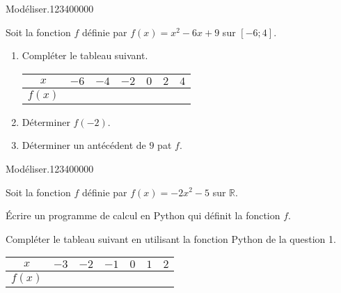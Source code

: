 \begin{pageAD}  %
\restoregeometry %

\begin{ExoCad}{Modéliser.}{1234}{0}{0}{0}{0}{0}

Soit la fonction $f$ définie par $f(x)=x^2-6x+9$ sur $[-6;4]$.  

\begin{enumerate}
\item Compléter le tableau suivant.

\begin{tabular}{|c|c|c|c|c|c|c|}
\hline 
$x$ & $-6$ &  $-4$ &  $-2$ &  $0$ &  $2$ &  $4$ \\ 
\hline 
$f(x)$ &   &   &   &  &  &   \\ 
\hline 
\end{tabular} 
\item Déterminer $f(-2)$.

\item Déterminer un antécédent de $9$ pat $f$.

\end{enumerate}


\end{ExoCad}




\begin{ExoCad}{Modéliser.}{1234}{0}{0}{0}{0}{0}

Soit la fonction $f$ définie par $f(x)=-2x^2-5$ sur $\mathbb R$. 

 
\begin{enumerate}[leftmargin=*]
\begin{minipage}[t]{0.48\linewidth}

\item Écrire un programme de calcul en Python qui définit la fonction $f$.

\end{minipage}
\hfill
\begin{minipage}[t]{0.48\linewidth}
\item Compléter le tableau suivant en utilisant la fonction Python de la question 1.

\begin{tabular}{|c|c|c|c|c|c|c|}
\hline 
$x$ & $-3$ &  $-2$ &  $-1$ &  $0$ &  $1$ &  $2$ \\ 
\hline 
$f(x)$ &   &   &   &  &  &   \\ 
\hline 
\end{tabular} 
\end{minipage}
\end{enumerate}


\end{ExoCad}
\end{pageAD}
